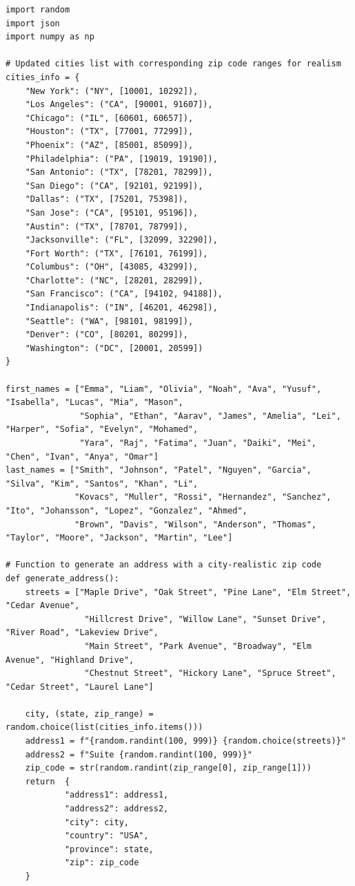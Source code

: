 \begin{verbatim}
import random
import json
import numpy as np

# Updated cities list with corresponding zip code ranges for realism
cities_info = {
    "New York": ("NY", [10001, 10292]),
    "Los Angeles": ("CA", [90001, 91607]),
    "Chicago": ("IL", [60601, 60657]),
    "Houston": ("TX", [77001, 77299]),
    "Phoenix": ("AZ", [85001, 85099]),
    "Philadelphia": ("PA", [19019, 19190]),
    "San Antonio": ("TX", [78201, 78299]),
    "San Diego": ("CA", [92101, 92199]),
    "Dallas": ("TX", [75201, 75398]),
    "San Jose": ("CA", [95101, 95196]),
    "Austin": ("TX", [78701, 78799]),
    "Jacksonville": ("FL", [32099, 32290]),
    "Fort Worth": ("TX", [76101, 76199]),
    "Columbus": ("OH", [43085, 43299]),
    "Charlotte": ("NC", [28201, 28299]),
    "San Francisco": ("CA", [94102, 94188]),
    "Indianapolis": ("IN", [46201, 46298]),
    "Seattle": ("WA", [98101, 98199]),
    "Denver": ("CO", [80201, 80299]),
    "Washington": ("DC", [20001, 20599])
}

first_names = ["Emma", "Liam", "Olivia", "Noah", "Ava", "Yusuf", "Isabella", "Lucas", "Mia", "Mason",
               "Sophia", "Ethan", "Aarav", "James", "Amelia", "Lei", "Harper", "Sofia", "Evelyn", "Mohamed",
               "Yara", "Raj", "Fatima", "Juan", "Daiki", "Mei", "Chen", "Ivan", "Anya", "Omar"]
last_names = ["Smith", "Johnson", "Patel", "Nguyen", "Garcia", "Silva", "Kim", "Santos", "Khan", "Li",
              "Kovacs", "Muller", "Rossi", "Hernandez", "Sanchez", "Ito", "Johansson", "Lopez", "Gonzalez", "Ahmed",
              "Brown", "Davis", "Wilson", "Anderson", "Thomas", "Taylor", "Moore", "Jackson", "Martin", "Lee"]

# Function to generate an address with a city-realistic zip code
def generate_address():
    streets = ["Maple Drive", "Oak Street", "Pine Lane", "Elm Street", "Cedar Avenue",
                "Hillcrest Drive", "Willow Lane", "Sunset Drive", "River Road", "Lakeview Drive",
                "Main Street", "Park Avenue", "Broadway", "Elm Avenue", "Highland Drive",
                "Chestnut Street", "Hickory Lane", "Spruce Street", "Cedar Street", "Laurel Lane"]

    city, (state, zip_range) = random.choice(list(cities_info.items()))
    address1 = f"{random.randint(100, 999)} {random.choice(streets)}"
    address2 = f"Suite {random.randint(100, 999)}"
    zip_code = str(random.randint(zip_range[0], zip_range[1]))
    return  {
            "address1": address1,
            "address2": address2,
            "city": city,
            "country": "USA",
            "province": state,
            "zip": zip_code
    }


\end{verbatim}
